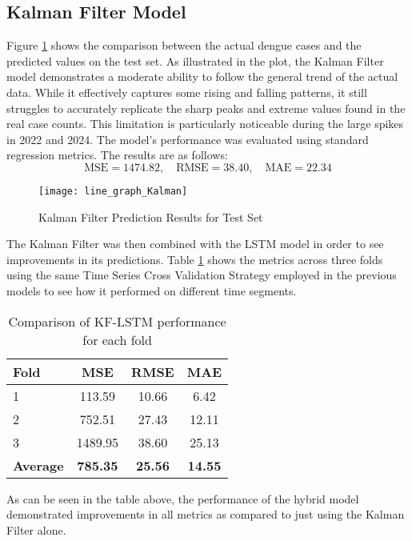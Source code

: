 \subsection{Kalman Filter Model}

Figure \ref{fig:Kalman_result} shows the comparison between the actual dengue cases and the predicted values on the test set. As illustrated in the plot, the Kalman Filter model demonstrates a moderate ability to follow the general trend of the actual data. While it effectively captures some rising and falling patterns, it still struggles to accurately replicate the sharp peaks and extreme values found in the real case counts. This limitation is particularly noticeable during the large spikes in 2022 and 2024. The model’s performance was evaluated using standard regression metrics. The results are as follows:
\[
\text{MSE} = 1474.82, \quad
\text{RMSE} = 38.40, \quad
\text{MAE} = 22.34
\]
\begin{figure}[H]
	\centering
	\texttt{[image: line\_graph\_Kalman]}
	\caption{Kalman Filter Prediction Results for Test Set}
	\label{fig:Kalman_result}
\end{figure}

The Kalman Filter was then combined with the LSTM model in order to see improvements in its predictions. Table \ref{tab:tcsv_kflstm} shows the metrics across three folds using the same Time Series Cross Validation Strategy employed in the previous models to see how it performed on different time segments.

\begin{table}[h!]
	\centering
	\begin{tabular}{|l|c|c|c|}
		\hline
		\textbf{Fold} & \textbf{MSE} & \textbf{RMSE} & \textbf{MAE} \\
		\hline
		1 & 113.59  & 10.66 & 6.42 \\
		2 & 752.51 & 27.43 & 12.11 \\
		3 & 1489.95  & 38.60 & 25.13 \\
		\hline
		\textbf{Average} & \textbf{785.35} & \textbf{25.56} & \textbf{14.55} \\
		\hline
	\end{tabular}
	\caption{Comparison of KF-LSTM performance for each fold}
	\label{tab:tcsv_kflstm}
\end{table}

As can be seen in the table above, the performance of the hybrid model demonstrated improvements in all metrics as compared to just using the Kalman Filter alone.

